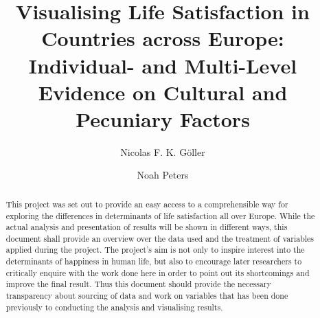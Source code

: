 \documentclass[preprint,12pt,authoryear]{elsarticle}
\begin{document}
\begin{frontmatter}



\title{Visualising Life Satisfaction in Countries across Europe: Individual- and Multi-Level Evidence on Cultural and Pecuniary Factors}

\author{Nicolas F. K. Göller}

\author{Noah Peters}

\address{Zeppelin University, Fallenbrunnen 3, 88045 Friedrichshafen}


\begin{abstract}
This project was set out to provide an easy access to a comprehensible way for exploring the differences in determinants of life satisfaction 
all over Europe. While the actual analysis and presentation of results will be shown in different ways, this document
shall provide an overview over the data used and the treatment of variables applied during the project. 
The project's aim is not only to inspire interest into the determinants of happiness in human life, but also to encourage
later researchers to critically enquire with the work done here in order to point out its shortcomings and improve the final
result. Thus this document should provide the necessary transparency about sourcing of data and work on variables that
has been done previously to conducting the analysis and visualising results.
\end{abstract}

\end{frontmatter}

\newpage
\tableofcontents
\newpage
\end{document}

